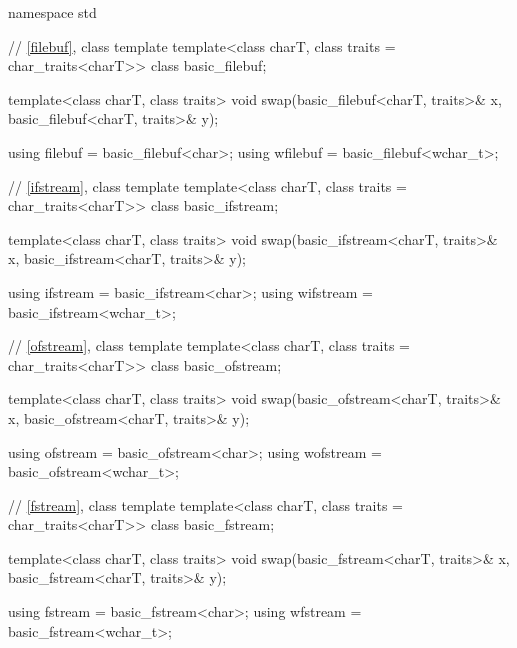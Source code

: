 %
%
%
%
%
%
%
%
%
%
%
%
%
%
%
%
%
\begin{codeblock}
namespace std {
  // \ref{filebuf}, class template 
  template<class charT, class traits = char_traits<charT>>
    class basic_filebuf;

  template<class charT, class traits>
    void swap(basic_filebuf<charT, traits>& x, basic_filebuf<charT, traits>& y);

  using filebuf  = basic_filebuf<char>;
  using wfilebuf = basic_filebuf<wchar_t>;

  // \ref{ifstream}, class template 
  template<class charT, class traits = char_traits<charT>>
    class basic_ifstream;

  template<class charT, class traits>
    void swap(basic_ifstream<charT, traits>& x, basic_ifstream<charT, traits>& y);

  using ifstream  = basic_ifstream<char>;
  using wifstream = basic_ifstream<wchar_t>;

  // \ref{ofstream}, class template 
  template<class charT, class traits = char_traits<charT>>
    class basic_ofstream;

  template<class charT, class traits>
    void swap(basic_ofstream<charT, traits>& x, basic_ofstream<charT, traits>& y);

  using ofstream  = basic_ofstream<char>;
  using wofstream = basic_ofstream<wchar_t>;

  // \ref{fstream}, class template 
  template<class charT, class traits = char_traits<charT>>
    class basic_fstream;

  template<class charT, class traits>
    void swap(basic_fstream<charT, traits>& x, basic_fstream<charT, traits>& y);

  using fstream  = basic_fstream<char>;
  using wfstream = basic_fstream<wchar_t>;
}
\end{codeblock}

